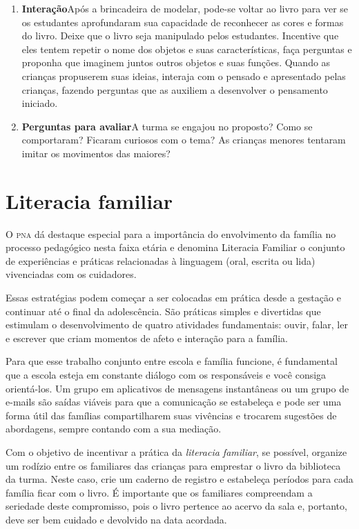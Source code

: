 \documentclass[11pt]{extarticle}
\begin{document}
\begin{enumerate}
\item \textbf{Interação}\quad Após a brincadeira de modelar, pode-se voltar ao livro para ver se os estudantes aprofundaram sua capacidade de reconhecer as cores e formas do livro.
Deixe que o livro seja manipulado pelos estudantes. Incentive que eles tentem repetir o nome dos objetos e suas características,
faça perguntas e proponha que imaginem juntos outros objetos e suas funções.
Quando as crianças propuserem suas ideias, interaja com o pensado e apresentado pelas crianças, fazendo perguntas que as auxiliem a desenvolver o pensamento iniciado.

\item \textbf{Perguntas para avaliar}\quad A turma se engajou no proposto? Como se comportaram? Ficaram curiosos com o tema? As crianças menores tentaram imitar os movimentos das maiores? 
\end{enumerate}


\section{Literacia familiar}
O \textsc{pna} dá destaque especial para a importância do envolvimento da família 
no processo pedagógico nesta faixa etária e denomina Literacia Familiar o conjunto 
de experiências e práticas relacionadas à linguagem (oral, escrita ou lida) vivenciadas 
com os cuidadores. 

Essas estratégias podem começar a ser colocadas em prática desde a 
gestação e continuar até o final da adolescência. São práticas simples e divertidas 
que estimulam o desenvolvimento de quatro atividades fundamentais: ouvir, falar, 
ler e escrever que criam momentos de afeto e interação para a família. 

Para que esse trabalho conjunto entre escola e família funcione, é 
fundamental que a escola esteja em constante diálogo com os responsáveis e 
você consiga orientá-los. Um grupo em aplicativos de mensagens instantâneas ou um 
grupo de e-mails são saídas viáveis para que a comunicação se estabeleça e pode ser 
uma forma útil das famílias compartilharem suas vivências e trocarem sugestões 
de abordagens, sempre contando com a sua mediação. 

Com o objetivo de incentivar 
a prática da \textit{literacia familiar}, se possível, organize um rodízio entre os familiares 
das crianças para emprestar o livro da biblioteca da turma. Neste caso, crie um caderno 
de registro e estabeleça períodos para cada família ficar com o livro. É importante 
que os familiares compreendam a seriedade deste compromisso, pois o livro pertence 
ao acervo da sala e, portanto, deve ser bem cuidado e devolvido na data acordada. 
\end{document}
